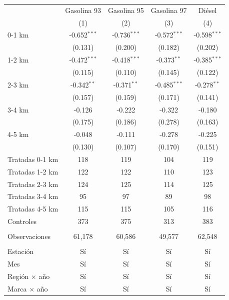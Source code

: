 
\begingroup
\centering
\begin{tabular}{lcccc}
   \toprule
                        & Gasolina 93    & Gasolina 95    & Gasolina 97    & Diésel \\   
                        & (1)            & (2)            & (3)            & (4)\\  
   \midrule 
   0-1 km               & -0.652$^{***}$ & -0.736$^{***}$ & -0.572$^{***}$ & -0.598$^{***}$\\   
                        & (0.131)        & (0.200)        & (0.182)        & (0.202)\\   
   1-2 km               & -0.472$^{***}$ & -0.418$^{***}$ & -0.373$^{**}$  & -0.385$^{***}$\\   
                        & (0.115)        & (0.110)        & (0.145)        & (0.122)\\   
   2-3 km               & -0.342$^{**}$  & -0.371$^{**}$  & -0.485$^{***}$ & -0.278$^{**}$\\   
                        & (0.157)        & (0.159)        & (0.171)        & (0.141)\\   
   3-4 km               & -0.126         & -0.222         & -0.322         & -0.180\\   
                        & (0.175)        & (0.186)        & (0.278)        & (0.163)\\   
   4-5 km               & -0.048         & -0.111         & -0.278         & -0.225\\   
                        & (0.130)        & (0.107)        & (0.170)        & (0.151)\\   
   Tratadas 0-1 km      & 118            & 119            & 104            & 119\\  
   Tratadas 1-2 km      & 122            & 122            & 110            & 123\\  
   Tratadas 2-3 km      & 124            & 125            & 114            & 125\\  
   Tratadas 3-4 km      & 95             & 97             & 89             & 98\\  
   Tratadas 4-5 km      & 115            & 115            & 105            & 116\\  
   Controles            & 373            & 375            & 313            & 383\\  
    \\
   Observaciones        & 61,178         & 60,586         & 49,577         & 62,548\\  
    \\
   Estación             & Sí             & Sí             & Sí             & Sí\\  
   Mes                  & Sí             & Sí             & Sí             & Sí\\  
   Región $\times$ año  & Sí             & Sí             & Sí             & Sí\\  
   Marca $\times$ año   & Sí             & Sí             & Sí             & Sí\\  
   \bottomrule
\end{tabular}
\par\endgroup


